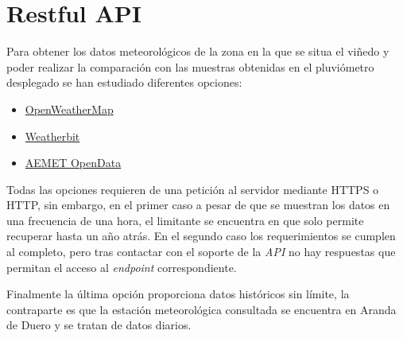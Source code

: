 \section{Restful API}
Para obtener los datos meteorológicos de la zona en la que se situa el viñedo y poder
realizar la comparación con las muestras obtenidas en el pluviómetro desplegado se han 
estudiado diferentes opciones:
\begin{itemize}
    \item \href{https://openweathermap.org/}{OpenWeatherMap}
    \item \href{https://www.weatherbit.io/}{Weatherbit}
    \item \href{https://www.aemet.es/es/datos_abiertos/AEMET_OpenData}{AEMET OpenData}
\end{itemize}

Todas las opciones requieren de una petición al servidor mediante HTTPS o HTTP, sin 
embargo, en el primer caso a pesar de que se muestran los datos en una frecuencia 
de una hora, el limitante se encuentra en que solo permite recuperar hasta un año atrás.
En el segundo caso los requerimientos se cumplen al completo, pero tras contactar con el
soporte de la \textit{API} no hay respuestas que permitan el acceso al 
\textit{endpoint} correspondiente.

Finalmente la última opción proporciona datos históricos sin límite, la contraparte es
que la estación meteorológica consultada se encuentra en Aranda de Duero y se tratan de
datos diarios.
